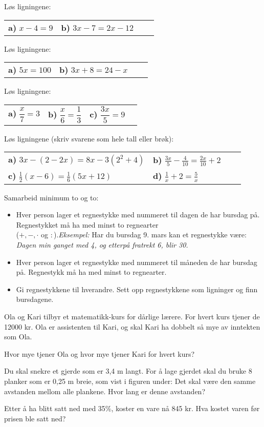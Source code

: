 



\opgt
\nes

Løs ligningene: \os
\begin{tabular}{@{}l l l l}
	\textbf{a)} $ x-4=9 $ &  \textbf{b)} $ 3x-7=2x-12 $ 
\end{tabular}
\nes

Løs ligningene: \os
\begin{tabular}{@{}l l l l}
	\textbf{a)} $ 5x=100 $ &  \textbf{b)} $ 3x+8=24-x $ 
\end{tabular}

\nes

Løs ligningene: \os
\begin{tabular}{@{}l l l l}
	\textbf{a)} $ \dfrac{x}{7}=3 $ & 
	\textbf{b)} $ \dfrac{x}{6}=\dfrac{1}{3} $ &   \textbf{c)} $ \dfrac{3x}{5}=9 $
\end{tabular}

\nes
{}
Løs ligningene (skriv svarene som hele tall eller brøk): \os
\begin{tabular}{@{}l l l l}
	\textbf{a)} $3x-(2-2x)=8x-3(2^2+4) $ & 
	\textbf{b)} $\displaystyle \frac{3x}{5} - \frac{4}{10} = \frac{2x}{10} +2 $ & \\[8 pt]
	\textbf{c)} $ \displaystyle \frac{1}{2}(x-6)=\frac{1}{6}(5x + 12)$ &
	\textbf{d)} $ \displaystyle \frac{1}{x}+2 = \frac{5}{x} $
\end{tabular}

\nes
{}
Samarbeid minimum to og to:\os
\begin{itemize}
	\item Hver person lager et regnestykke med nummeret til dagen de har bursdag på. Regnestykket må ha med minst to regnearter \\($ +,-,\cdot $ og $ : $).\os \textsl{Eksempel:} Har du bursdag 9. mars kan et regnestykke være: \textit{Dagen min ganget med 4, og etterpå fratrekt 6, blir 30.}
	\item Hver person lager et regnestykke med nummeret til måneden de har bursdag på. Regnestykk må ha med minst to regnearter.
	\item Gi regnestykkene til hverandre. Sett opp regnestykkene som ligninger og finn bursdagene.
\end{itemize}
\newpage
{}
Ola og Kari tilbyr et matematikk-kurs for dårlige lærere. For hvert kurs tjener de 12000 kr. Ola er assistenten til Kari, og skal Kari ha dobbelt så mye av inntekten som Ola. \os

Hvor mye tjener Ola og hvor mye tjener Kari for hvert kurs?

Du skal snekre et gjerde som er 3,4 m langt. For å lage gjerdet skal du bruke 8 planker som er 0,25 m breie, som vist i figuren under:
Det skal være den samme avstanden mellom alle plankene. Hvor lang er denne avstanden?

Etter å ha blitt satt ned med 35\%, koster en vare nå 845 kr. Hva kostet varen før prisen ble satt ned?




